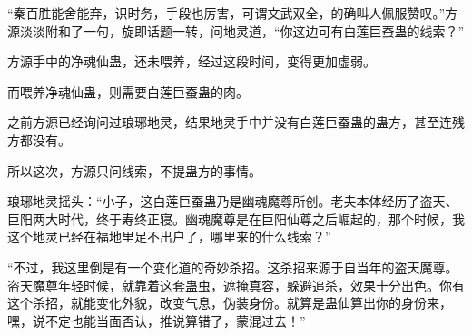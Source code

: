\begin{this_body}
“秦百胜能舍能弃，识时务，手段也厉害，可谓文武双全，的确叫人佩服赞叹。”方源淡淡附和了一句，旋即话题一转，问地灵道，“你这边可有白莲巨蚕蛊的线索？”

方源手中的净魂仙蛊，还未喂养，经过这段时间，变得更加虚弱。

而喂养净魂仙蛊，则需要白莲巨蚕蛊的肉。

之前方源已经询问过琅琊地灵，结果地灵手中并没有白莲巨蚕蛊的蛊方，甚至连残方都没有。

所以这次，方源只问线索，不提蛊方的事情。

琅琊地灵摇头：“小子，这白莲巨蚕蛊乃是幽魂魔尊所创。老夫本体经历了盗天、巨阳两大时代，终于寿终正寝。幽魂魔尊是在巨阳仙尊之后崛起的，那个时候，我这个地灵已经在福地里足不出户了，哪里来的什么线索？”

“不过，我这里倒是有一个变化道的奇妙杀招。这杀招来源于自当年的盗天魔尊。盗天魔尊年轻时候，就靠着这套蛊虫，遮掩真容，躲避追杀，效果十分出色。你有这个杀招，就能变化外貌，改变气息，伪装身份。就算是蛊仙算出你的身份来，嘿，说不定也能当面否认，推说算错了，蒙混过去！”

\end{this_body}

